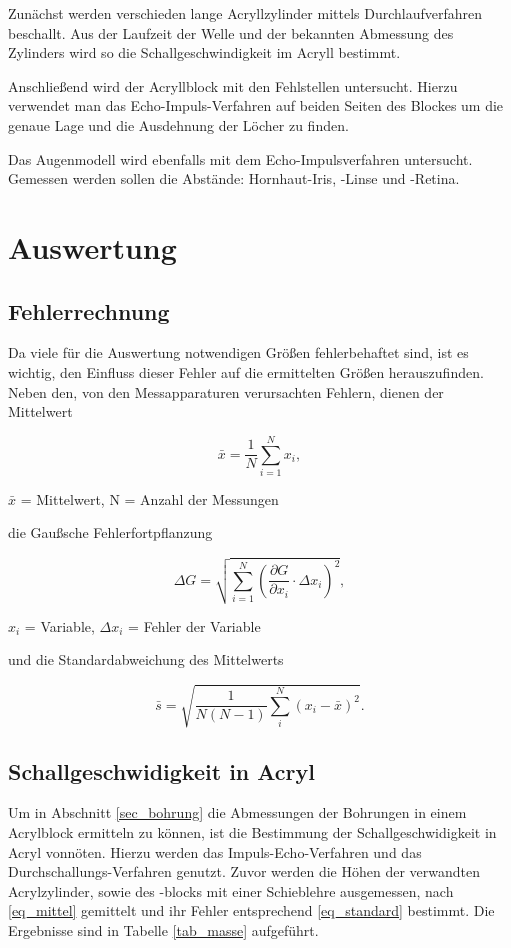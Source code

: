 Zunächst werden verschieden lange Acryllzylinder mittels Durchlaufverfahren beschallt. Aus der Laufzeit der Welle und der bekannten Abmessung des Zylinders wird so die Schallgeschwindigkeit im Acryll bestimmt.

Anschließend wird der Acryllblock mit den Fehlstellen untersucht. Hierzu verwendet man das Echo-Impuls-Verfahren auf beiden Seiten des Blockes um die genaue Lage und die Ausdehnung der Löcher zu finden.

Das Augenmodell wird ebenfalls mit dem Echo-Impulsverfahren untersucht. Gemessen werden sollen die Abstände: Hornhaut-Iris, -Linse und -Retina.


\section{Auswertung}
\subsection{Fehlerrechnung}
Da viele für die Auswertung notwendigen Größen fehlerbehaftet sind, ist es wichtig, den Einfluss dieser Fehler auf die ermittelten
Größen herauszufinden. Neben den, von den Messapparaturen verursachten Fehlern, dienen der Mittelwert
\begin{formel}[H]
\begin{equation}
 \bar{x} = \frac1N \sum_{i=1}^{N} x_i,
 \label{eq_mittel}
\end{equation}
\caption*{\small{$\bar{x}$ = Mittelwert, N = Anzahl der Messungen}}
\end{formel}

die Gaußsche Fehlerfortpflanzung

\begin{formel}[H]
\begin{equation}
\Delta G = \sqrt{\sum_{i=1}^{N}\left( \frac{\partial G}{\partial x_i}\cdot \Delta x_i\right)^2},
\label{gauss}
\end{equation}
\caption*{$x_i$ = Variable, $\Delta x_i$ = Fehler der Variable}
\end{formel}
und die Standardabweichung des Mittelwerts

\begin{equation}
 \bar s = \sqrt{\frac{1}{N(N-1)} \sum_{i}^{N} (x_i - \bar{x})^2}.
 \label{eq_standard}
\end{equation}

\subsection{Schallgeschwidigkeit in Acryl}
Um in Abschnitt \ref{sec_bohrung} die Abmessungen der Bohrungen in einem Acrylblock ermitteln zu können, ist die Bestimmung der Schallgeschwidigkeit 
in Acryl vonnöten. Hierzu werden das Impuls-Echo-Verfahren und das Durchschallungs-Verfahren genutzt. Zuvor werden die Höhen der verwandten
Acrylzylinder, sowie des -blocks mit einer Schieblehre ausgemessen, nach \eqref{eq_mittel} gemittelt und ihr Fehler entsprechend 
\eqref{eq_standard} bestimmt. Die Ergebnisse sind in Tabelle \ref{tab_masse} aufgeführt.

